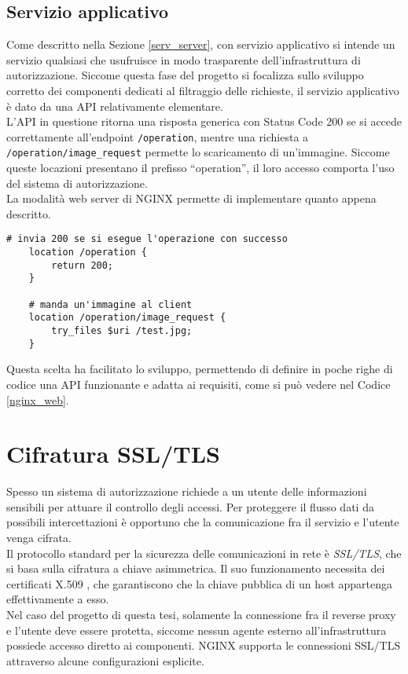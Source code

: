 \subsection{Servizio applicativo}
Come descritto nella Sezione \ref*{serv_server}, con servizio applicativo si intende un servizio qualsiasi che usufruisce in modo trasparente 
dell'infrastruttura di autorizzazione. 
Siccome questa fase del progetto si focalizza sullo sviluppo corretto dei componenti dedicati 
al filtraggio delle richieste, il servizio applicativo è dato da una API relativamente elementare. \\
L'API in questione ritorna una risposta generica con Status Code 200 se si accede correttamente all'endpoint \texttt{/operation}, 
mentre una richiesta a \texttt{/operation/image\_request} permette lo scaricamento di 
un'immagine. Siccome queste locazioni presentano il prefisso ``operation'', il loro accesso comporta l'uso 
del sistema di autorizzazione.  
\\La modalità web server di NGINX permette di implementare quanto appena descritto.
\lstset{language=nginx}
\begin{lstlisting}[caption={[Frammento di codice del servizio applicativo]Frammento di codice del servizio applicativo che mostra le funzionalità associate agli endpoint.},captionpos=b,label=nginx_web]
    # invia 200 se si esegue l'operazione con successo
    location /operation {
        return 200;
    }

    # manda un'immagine al client
    location /operation/image_request {
        try_files $uri /test.jpg;
    }
\end{lstlisting}
Questa scelta ha facilitato lo sviluppo, permettendo di definire in poche righe di codice una API funzionante e adatta ai requisiti,  
come si può vedere nel Codice \ref*{nginx_web}.

\section{Cifratura SSL/TLS}
Spesso un sistema di autorizzazione richiede a un utente delle informazioni sensibili per attuare il controllo 
degli accessi. 
Per proteggere il flusso dati da possibili intercettazioni è opportuno che la comunicazione fra il servizio e l'utente venga cifrata. 
\\ Il protocollo standard per la sicurezza delle comunicazioni in rete \newline è \textit{SSL/TLS}, che si basa sulla cifratura a chiave asimmetrica. Il suo funzionamento necessita 
dei certificati X.509 \cite{x509_rfc}, che garantiscono che la chiave pubblica di un host appartenga effettivamente a esso. 
\\ Nel caso del progetto di questa tesi, solamente la connessione fra il reverse proxy e l'utente deve essere protetta, siccome nessun agente esterno
 all'infrastruttura possiede accesso diretto ai componenti.
NGINX supporta le connessioni SSL/TLS attraverso alcune configurazioni esplicite.


